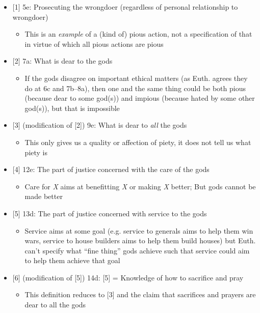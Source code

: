 \documentclass[11pt]{article}
\begin{document}
\begin{itemize}

\item{[1] 5e: Prosecuting the wrongdoer (regardless of personal relationship to wrongdoer)}

\begin{itemize}\item{This is an \emph{example} of a (kind of) pious action, not a specification of that in virtue of which all pious actions are pious}\end{itemize}

\item{[2] 7a: What is dear to the gods}

\begin{itemize}\item{If the gods disagree on important ethical matters (as Euth. agrees they do at 6c and 7b--8a), then one and the same thing could be both pious (because dear to some god(s)) and impious (because hated by some other god(s)), but that is impossible}\end{itemize}

\item{[3] (modification of [2]) 9e: What is dear to \emph{all} the gods}

\begin{itemize}\item{This only gives us a quality or affection of piety, it does not tell us what piety is}\end{itemize}

\item{[4] 12e: The part of justice concerned with the care of the gods}

\begin{itemize}\item{Care for \emph{X} aims at benefitting \emph{X} or making \emph{X} better; But gods cannot be made better}\end{itemize}

\item{[5] 13d: The part of justice concerned with service to the gods}

\begin{itemize}\item{Service aims at some goal (e.g. service to generals aims to help them win wars, service to house builders aims to help them build houses) but Euth. can't specify what ``fine thing'' gods achieve such that service could aim to help them achieve that goal}\end{itemize} 

\item{[6] (modification of [5]) 14d: [5] = Knowledge of how to sacrifice and pray}

\begin{itemize}\item{This definition reduces to [3] and the claim that sacrifices and prayers are dear to all the gods}\end{itemize}

\end{itemize}
\vspace*{-8mm}
\end{document}
